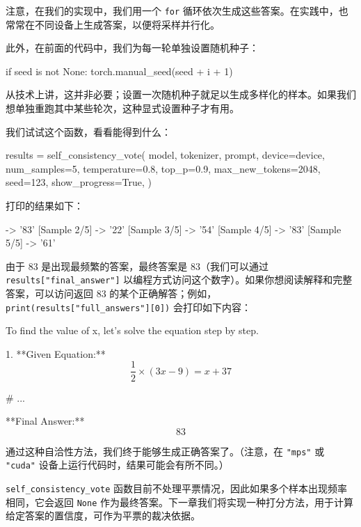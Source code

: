 注意，在我们的实现中，我们用一个 \texttt{for} 循环依次生成这些答案。在实践中，也常常在不同设备上生成答案，以便将采样并行化。

此外，在前面的代码中，我们为每一轮单独设置随机种子：

\begin{codebox}
        if seed is not None:
            torch.manual_seed(seed + i + 1)
\end{codebox}

从技术上讲，这并非必要；设置一次随机种子就足以生成多样化的样本。如果我们想单独重跑其中某些轮次，这种显式设置种子才有用。

我们试试这个函数，看看能得到什么：

\begin{codebox}
results = self_consistency_vote(
    model,
    tokenizer,
    prompt,
    device=device,
    num_samples=5,
    temperature=0.8,
    top_p=0.9,
    max_new_tokens=2048,
    seed=123,
    show_progress=True,
)
\end{codebox}

打印的结果如下：

\begin{codebox}
[Sample 1/5] -> '83'
[Sample 2/5] -> '22'
[Sample 3/5] -> '54'
[Sample 4/5] -> '83'
[Sample 5/5] -> '61'
\end{codebox}

由于 83 是出现最频繁的答案，最终答案是 83（我们可以通过 \texttt{results[}\texttt{"}\texttt{final\_answer}\texttt{"}\texttt{]} 以编程方式访问这个数字）。如果你想阅读解释和完整答案，可以访问返回 83 的某个正确解答；例如，\texttt{print(results[}\texttt{"}\texttt{full\_answers}\texttt{"}\texttt{][0])} 会打印如下内容：

\begin{codebox}
To find the value of x, let's solve the equation step by step.

1. **Given Equation:**
   \[
   \frac{1}{2} \times (3x - 9) = x + 37
   \]

# ...

**Final Answer:**
\[
\boxed{83}
\]
\end{codebox}

通过这种自洽性方法，我们终于能够生成正确答案了。（注意，在 \texttt{"}\texttt{mps}\texttt{"} 或 \texttt{"}\texttt{cuda}\texttt{"} 设备上运行代码时，结果可能会有所不同。）

\texttt{self\_consistency\_vote} 函数目前不处理平票情况，因此如果多个样本出现频率相同，它会返回 \texttt{None} 作为最终答案。下一章我们将实现一种打分方法，用于计算给定答案的置信度，可作为平票的裁决依据。


